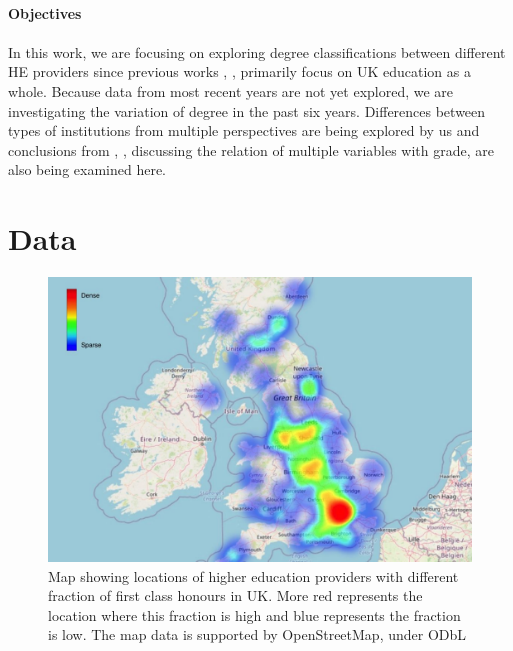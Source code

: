 \documentclass[11pt,a4paper]{article}
\begin{document}
\paragraph{Objectives}
\paragraph{}

In this work, we are focusing on exploring degree classifications between different HE providers since previous works \cite{HESA}, \cite{FancyPink}, \cite{FancyGreen} primarily focus on UK education as a whole. Because data from most recent years are not yet explored, we are investigating the variation of degree in the past six years. Differences between types of institutions from multiple perspectives are being explored by us and conclusions from \cite{BayMain}, \cite{NORDIN2019101936}, discussing the relation of multiple variables with grade, are also being examined here. 

\section{Data}

\begin{figure}[t]
    \centering
    \includegraphics[scale=0.5]{report/Q22FF.pdf}
    \caption{Map showing locations of higher education providers with different fraction of first class honours in UK. More red represents the location where this fraction is high and blue represents the fraction is low. The map data is supported by OpenStreetMap, under ODbL}
    \label{fig:Q12}
\end{figure}
\end{document}
